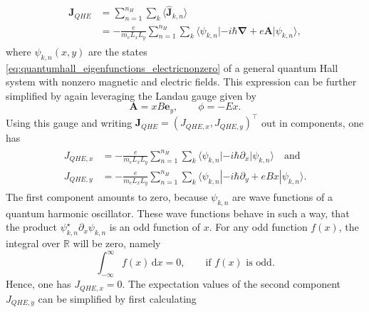 \documentclass{report}
\numberwithin{tm}{section}
\newcommand\vect[1]{\ensuremath{\bm{#1}}}
\begin{document}
\begin{align}\begin{aligned}
	\vect{J}_{QHE} &= \sum_{n=1}^{n_H}\sum_{k} \langle \hat{\vect{J}}_{k,n}\rangle \\
	&= -\frac{e}{m_eL_xL_y}\sum_{n=1}^{n_H}\sum_{k}\langle \psi_{k,n}|-i\hbar\vect{\nabla} + e\vect{A}|\psi_{k,n}\rangle,
\end{aligned}\end{align}  where $\psi_{k,n}(x,y)$ are the states \cref{eq:quantumhall_eigenfunctions_electricnonzero} of a general quantum Hall system with nonzero magnetic and electric fields. This expression can be further simplified by again leveraging the Landau gauge given by \begin{equation}
\vect{A} = xB\vect{e}_y, \qquad \phi = -Ex.
\end{equation} Using this gauge and writing $\vect{J}_{QHE} = (J_{QHE,x}, J_{QHE,y})^\top$ out in components, one has \begin{align}\begin{aligned}
J_{QHE,x} &= - \frac{e}{m_eL_xL_y}\sum_{n=1}^{n_H}\sum_{k}\langle \psi_{k,n}|-i\hbar\partial_x|\psi_{k,n}\rangle \quad  \text{and} \\
	J_{QHE,y} &= - \frac{e}{m_eL_xL_y}\sum_{n=1}^{n_H}\sum_{k}\langle \psi_{k,n}|-i\hbar\partial_y + eBx|\psi_{k,n}\rangle.
\end{aligned}\end{align}
The first component amounts to zero, because $\psi_{k,n}$ are wave functions of a quantum harmonic oscillator. These wave functions behave in such a way, that the product $\psi_{k,n}^\star \partial_x\psi_{k,n}$ is an odd function of $x$. For any odd function $f(x)$, the integral over $\mathbb{R}$ will be zero, namely \begin{equation}
\int_{-\infty}^\infty f(x)\,\mathrm{d}x = 0, \qquad \text{if } f(x)\text{ is odd.}
\end{equation} Hence, one has $J_{QHE,x} = 0$. The expectation values of the second component $J_{QHE,y}$ can be simplified by first calculating
\end{document}
